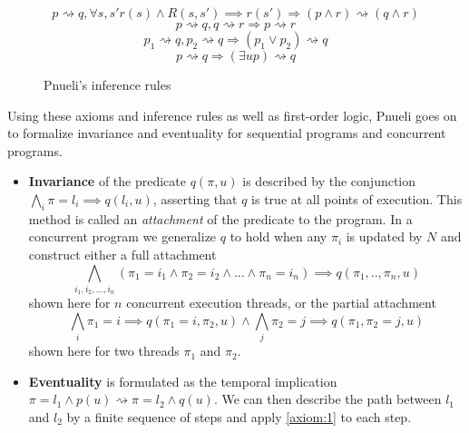 \documentclass{uit-thesis}
\newcommand{\eventually}{\rightsquigarrow}
\begin{document}
\begin{figure}[h]
    \begin{equation}\tag{R1}\label{rules:1}
        p \eventually q, \forall s, s' r(s) \land R(s,s') \implies r(s') \Rightarrow (p \land r) \eventually (q \land r)
    \end{equation}
    \begin{equation}\tag{R2}\label{rules:2}
        p \eventually q, q \eventually r \Rightarrow p \eventually r
    \end{equation}
    \begin{equation}\tag{R3}\label{rules:3}
        p_1 \eventually q, p_2 \eventually q \Rightarrow (p_1 \lor p_2) \eventually q
    \end{equation}
    \begin{equation}\tag{R4}\label{rules:4}
        p \eventually q \Rightarrow (\exists u p) \eventually q
    \end{equation}
\caption{Pnueli's inference rules}
\end{figure}

Using these axioms and inference rules as well as first-order logic, Pnueli goes on to formalize invariance and eventuality for sequential programs and concurrent programs.

\begin{itemize}[label={}]
    \item \textbf{Invariance} of the predicate $q(\pi, u)$ is described by the conjunction $\bigwedge\limits_{i}{\pi=l_i \implies q(l_i, u)}$, asserting that $q$ is true at all points of execution. This method is called an \textit{attachment} of the predicate to the program.
    \newpage{}
    In a concurrent program we generalize $q$ to hold when any $\pi_i$ is updated by $N$ and construct either a full attachment
    $$\bigwedge\limits_{i_1, i_2,...,i_n}{(\pi_1 = i_1 \land \pi_2 = i_2 \land ... \land \pi_n = i_n) \implies q(\pi_1,..,\pi_n,u)}$$ shown here for $n$ concurrent execution threads,
    or the partial attachment
    $$\bigwedge\limits_{i}{\pi_1=i \implies q(\pi_1 = i, \pi_2, u)} \land \bigwedge\limits_{j}{\pi_2=j \implies q(\pi_1, \pi_2 = j, u)}$$ shown here for two threads $\pi_1$ and $\pi_2$.
    \item \textbf{Eventuality} is formulated as the temporal implication $\pi = l_1 \land p(u) \eventually \pi=l_2 \land q(u)$. We can then describe the path between $l_1$ and $l_2$ by a finite sequence of steps and apply \ref{axiom:1} to each step.
\end{itemize}
\end{document}
